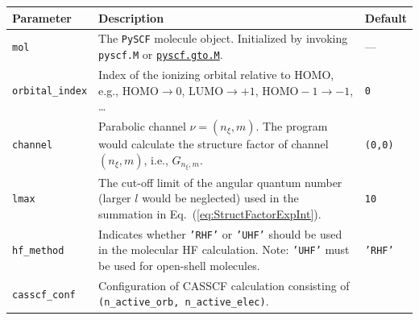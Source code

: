 \documentclass[preprint,12pt]{elsarticle} %
\renewcommand{\rm}[1]{\mathrm{#1}}    %
\begin{document}
\begin{table}[tb]
    \small
    \centering
    \begin{tabular}{l p{9cm} l}
        \hline \hline
        Parameter                   & Description                                                                                               & Default           \\
        \hline
        \texttt{mol}                & The \texttt{PySCF} molecule object. Initialized by invoking \texttt{pyscf.M} or
                                      \href{https://pyscf.org/pyscf_api_docs/pyscf.gto.html#module-pyscf.gto.mole}{\texttt{pyscf.gto.M}}.
                                                                                                                                                & ---               \\
        \texttt{orbital\_index}     & Index of the ionizing orbital relative to HOMO, e.g., $\rm{HOMO} \rightarrow 0$,
                                      $\rm{LUMO} \rightarrow +1$, $\rm{HOMO-1} \rightarrow -1$, …
                                                                                                                                                & \texttt{0}        \\
        \texttt{channel}            & Parabolic channel $\nu=(n_\xi, m)$.
                                      The program would calculate the structure factor of channel $(n_\xi, m)$, i.e., $G_{n_\xi,m}$.
                                                                                                                                                & \texttt{(0,0)}    \\
        \texttt{lmax}               & The cut-off limit of the angular quantum number (larger $l$ would be neglected)
                                      used in the summation in Eq.~(\ref{eq:StructFactorExpInt}).
                                                                                                                                                & \texttt{10}       \\
        \texttt{hf\_method}         & Indicates whether \texttt{'RHF'} or \texttt{'UHF'} should be used in the molecular HF calculation.
                                      Note: \texttt{'UHF'} must be used for open-shell molecules.
                                                                                                                                                & \texttt{'RHF'}    \\
        \texttt{casscf\_conf}       & Configuration of CASSCF calculation consisting of \texttt{(n\_active\_orb, n\_active\_elec)}.

\end{tabular}
\end{table}
\end{document}
